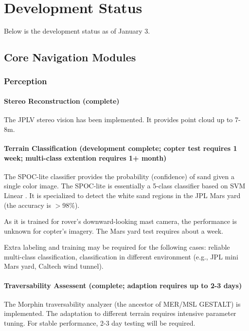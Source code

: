 \documentclass[conference]{IEEEtran}
\newcommand{\done}[1]{{\color{gray} #1}}
\begin{document}
\clearpage
\section{Development Status}

Below is the development status as of January 3.

\subsection{Core Navigation Modules}

\subsubsection{Perception}

\paragraph{Stereo Reconstruction (complete)}
\done{
The JPLV stereo vision has been implemented. It provides point cloud up to 7-8m. 
}

\paragraph{Terrain Classification (development complete; copter test requires 1 week; multi-class extention requires 1+ month)}
The SPOC-lite classifier provides the probability (confidence) of sand given a single color image. The SPOC-lite is essentially a 5-class classifier based on SVM Linear \cite{liblinear}. It is specialized to detect the white sand regions in the JPL Mars yard (the accuracy is $>$98\%).

As it is trained for rover's downward-looking mast camera, the performance is unknown for copter's imagery. The Mars yard test requires about a week. 

Extra labeling and training may be required for the following cases: reliable multi-class classification, classification in different environment (e.g., JPL mini Mars yard, Caltech wind tunnel). 


\paragraph{Traversability Assessent (complete; adaption requires up to 2-3 days)}
\done{
The Morphin traversability analyzer (the ancestor of MER/MSL GESTALT) is implemented. The adaptation to different terrain requires intensive parameter tuning. For stable performance, 2-3 day testing will be required.
}
\end{document}
